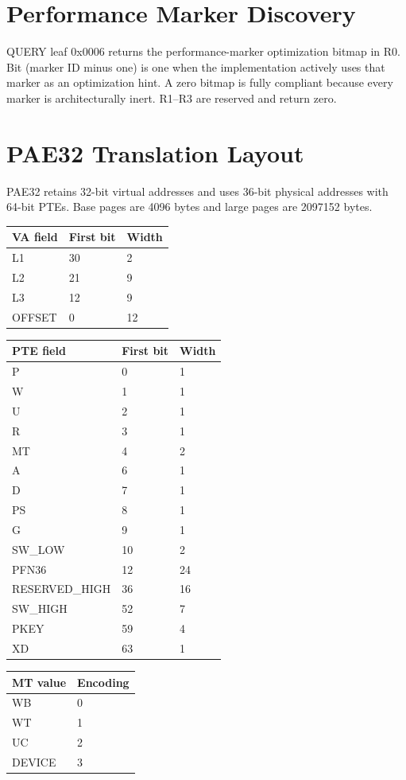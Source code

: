 \documentclass[10pt]{article}
\begin{document}
\section{Performance Marker Discovery}
QUERY leaf 0x0006 returns the performance-marker optimization bitmap in R0. Bit (marker ID minus one) is one when the implementation actively uses that marker as an optimization hint. A zero bitmap is fully compliant because every marker is architecturally inert. R1--R3 are reserved and return zero.
\section{PAE32 Translation Layout}
PAE32 retains 32-bit virtual addresses and uses 36-bit physical addresses with 64-bit PTEs. Base pages are 4096 bytes and large pages are 2097152 bytes.
\begin{longtable}{@{}L{3cm}L{2cm}L{2cm}@{}}
\toprule VA field & First bit & Width \\ \midrule
L1 & 30 & 2 \\
L2 & 21 & 9 \\
L3 & 12 & 9 \\
OFFSET & 0 & 12 \\
\bottomrule\end{longtable}
\begin{longtable}{@{}L{3cm}L{2cm}L{2cm}@{}}
\toprule PTE field & First bit & Width \\ \midrule
P & 0 & 1 \\
W & 1 & 1 \\
U & 2 & 1 \\
R & 3 & 1 \\
MT & 4 & 2 \\
A & 6 & 1 \\
D & 7 & 1 \\
PS & 8 & 1 \\
G & 9 & 1 \\
SW\_\allowbreak{}LOW & 10 & 2 \\
PFN36 & 12 & 24 \\
RESERVED\_\allowbreak{}HIGH & 36 & 16 \\
SW\_\allowbreak{}HIGH & 52 & 7 \\
PKEY & 59 & 4 \\
XD & 63 & 1 \\
\bottomrule\end{longtable}
\begin{longtable}{@{}L{3cm}L{2cm}@{}}
\toprule MT value & Encoding \\ \midrule
WB & 0 \\
WT & 1 \\
UC & 2 \\
DEVICE & 3 \\
\bottomrule\end{longtable}
\end{document}
